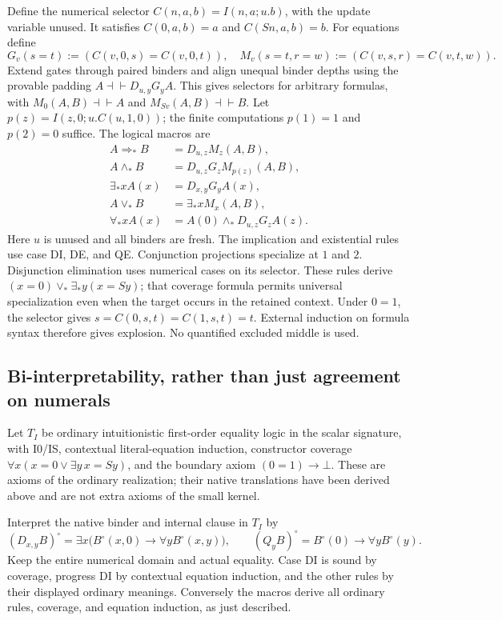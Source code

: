 Define the numerical selector $C(n,a,b)=I(n,a;u.b)$, with the update
variable unused. It satisfies $C(0,a,b)=a$ and $C(Sn,a,b)=b$.
For equations define
\[
 G_v(s=t):=(C(v,0,s)=C(v,0,t)),
 \quad
 M_v(s=t,r=w):=(C(v,s,r)=C(v,t,w)).
\]
Extend gates through paired binders and align unequal binder depths
using the provable padding $A\dashv\vdash D_{u,y}G_yA$.
This gives selectors for arbitrary formulas, with
$M_0(A,B)\dashv\vdash A$ and $M_{Sv}(A,B)\dashv\vdash B$.
Let $p(z)=I(z,0;u.C(u,1,0))$; the finite computations
$p(1)=1$ and $p(2)=0$ suffice. The logical macros are
\[
\begin{aligned}
 A\Rightarrow_*B&=D_{u,z}M_z(A,B),\\
 A\wedge_*B&=D_{u,z}G_zM_{p(z)}(A,B),\\
 \exists_*xA(x)&=D_{x,y}G_yA(x),\\
 A\vee_*B&=\exists_*xM_x(A,B),\\
 \forall_*xA(x)&=A(0)\wedge_*D_{u,z}G_zA(z).
\end{aligned}
\]
Here $u$ is unused and all binders are fresh. The implication and
existential rules use case DI, DE, and QE. Conjunction projections
specialize at $1$ and $2$. Disjunction elimination uses numerical
cases on its selector. These rules derive
$(x=0)\vee_*\exists_*y(x=Sy)$; that coverage formula permits
universal specialization even when the target occurs in the retained
context. Under $0=1$, the selector gives
$s=C(0,s,t)=C(1,s,t)=t$. External induction on formula syntax
therefore gives explosion. No quantified excluded middle is used.

\subsection{Bi-interpretability, rather than just agreement on numerals}

Let $T_I$ be ordinary intuitionistic first-order equality logic in the
scalar signature, with I0/IS, contextual literal-equation induction,
constructor coverage $\forall x(x=0\lor\exists y\,x=Sy)$, and the
boundary axiom $(0=1)\to\bot$. These are axioms of the ordinary
realization; their native translations have been derived above and
are not extra axioms of the small kernel.

Interpret the native binder and internal clause in $T_I$ by
\[
 (D_{x,y}B)^\circ=\exists x\bigl(B^\circ(x,0)\to
                  \forall yB^\circ(x,y)\bigr),
 \qquad
 (Q_yB)^\circ=B^\circ(0)\to\forall yB^\circ(y).
\]
Keep the entire numerical domain and actual equality. Case DI is
sound by coverage, progress DI by contextual equation induction,
and the other rules by their displayed ordinary meanings.
Conversely the macros derive all ordinary rules, coverage, and
equation induction, as just described.

